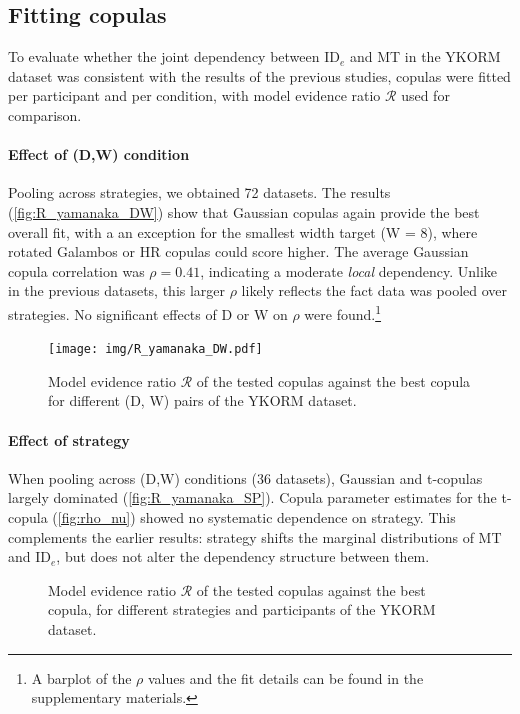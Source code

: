 \documentclass[acmlarge, manuscript,review]{acmart}
\newcommand{\ide}{\ensuremath{{\text{ID}_e}}\xspace}
\begin{document}
\subsection{Fitting copulas}
To evaluate whether the joint dependency between \ide and MT in the YKORM dataset was consistent with the results of the previous studies, copulas were fitted per participant and per condition, with model evidence ratio $\mathcal{R}$ used for comparison.

\paragraph{Effect of (D,W) condition}
Pooling across strategies, we obtained 72 datasets. The results (\autoref{fig:R_yamanaka_DW}) show that Gaussian copulas again provide the best overall fit, with a an exception for the smallest width target (W = 8), where rotated Galambos or HR copulas could score higher. The average Gaussian copula correlation was $\rho = 0.41$, indicating a moderate \textit{local} dependency. Unlike in the previous datasets, this larger $\rho$ likely reflects the fact data was pooled over strategies. No significant effects of D or W on $\rho$ were found.\footnote{A barplot of the $\rho$ values and the fit details can be found in the supplementary materials.}


\begin{figure}[htbp]
	\centering
	\texttt{[image: img/R\_yamanaka\_DW.pdf]}
	\caption{Model evidence ratio $\mathcal{R}$ of the tested copulas against the best copula for different (D, W) pairs of the YKORM dataset.}
	\label{fig:R_yamanaka_DW}
\end{figure}


\paragraph{Effect of strategy}
When pooling across (D,W) conditions (36 datasets), Gaussian and t-copulas largely dominated (\autoref{fig:R_yamanaka_SP}). Copula parameter estimates for the t-copula (\autoref{fig:rho_nu}) showed no systematic dependence on strategy. This complements the earlier results: strategy shifts the marginal distributions of MT and \ide, but does not alter the dependency structure between them.



\begin{figure}[htbp]
	\centering
	\caption{Model evidence ratio $\mathcal{R}$ of the tested copulas against the best copula, for different strategies and participants of the YKORM dataset.}
	\label{fig:R_yamanaka_SP}
\end{figure}
\end{document}
